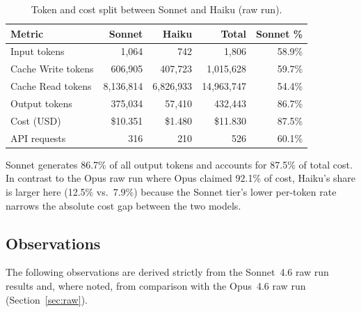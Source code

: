 \begin{table}[h]
\centering
\caption{Token and cost split between Sonnet and Haiku (raw run).}\label{tab:model-split-raw-sonnet}
\begin{tabular}{lrrrr}
\toprule
\textbf{Metric} & \textbf{Sonnet} & \textbf{Haiku} & \textbf{Total} & \textbf{Sonnet \%} \\
\midrule
Input tokens       &      1{,}064 &          742 &      1{,}806 &  58.9\% \\
Cache Write tokens &    606{,}905 &    407{,}723 &  1{,}015{,}628 &  59.7\% \\
Cache Read tokens  &  8{,}136{,}814 & 6{,}826{,}933 & 14{,}963{,}747 &  54.4\% \\
Output tokens      &    375{,}034 &     57{,}410 &    432{,}443 &  86.7\% \\
Cost (USD)         &     \$10.351 &      \$1.480 &     \$11.830 &  87.5\% \\
API requests       &          316 &          210 &          526 &  60.1\% \\
\bottomrule
\end{tabular}
\end{table}

\noindent
Sonnet generates 86.7\% of all output tokens and accounts for 87.5\% of
total cost.  In contrast to the Opus raw run where Opus claimed 92.1\%
of cost, Haiku's share is larger here (12.5\% vs.\ 7.9\%) because the
Sonnet tier's lower per-token rate narrows the absolute cost gap between
the two models.

\subsection{Observations}\label{sec:raw-sonnet-obs}

The following observations are derived strictly from the Sonnet~4.6 raw
run results and, where noted, from comparison with the Opus~4.6 raw run
(Section~\ref{sec:raw}).

